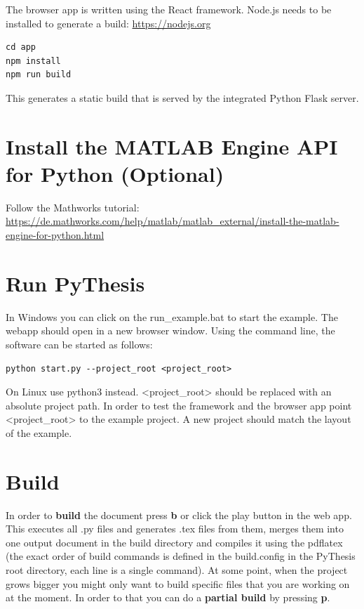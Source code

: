 \documentclass[a4paper]{book}
\begin{document}
The browser app is written using the React framework. Node.js needs to be installed to generate a build: \url{https://nodejs.org} 
\begin{verbatim}
cd app
npm install
npm run build
\end{verbatim}
This generates a static build that is served by the integrated Python Flask server.  
\section{Install the MATLAB Engine API for Python (Optional)}
Follow the Mathworks tutorial: \url{https://de.mathworks.com/help/matlab/matlab_external/install-the-matlab-engine-for-python.html}

\section{Run PyThesis}
In Windows you can click on the run\_example.bat to start the example. The webapp should open in a new browser window. Using the command line, the software can be started as follows: 
\begin{verbatim}
python start.py --project_root <project_root>
\end{verbatim}
On Linux use python3 instead. <project\_root> should be replaced with an absolute project path. In order to test the framework and the browser app point <project\_root> to the example project. A new project should match the layout of the example.


\section{Build}
\label{sec:build}
In order to \textbf{build} the document press \textbf{b} or click the play button in the web app. This executes all .py files and generates .tex files from them, merges them into one output document in the build directory and compiles it using the pdflatex (the exact order of build commands is defined in the build.config in the PyThesis root directory, each line is a single command). At some point, when the project grows bigger you might only want to build specific files that you are working on at the moment. In order to that you can do a \textbf{partial build} by pressing \textbf{p}.  
\end{document}
